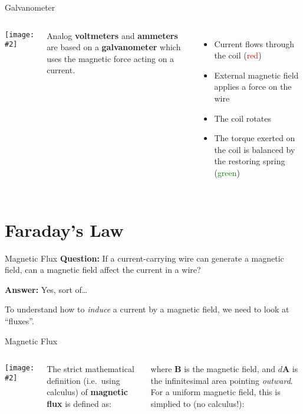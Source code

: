 \documentclass[12pt,aspectratio=169]{beamer}
\newcommand{\pic}[2]{\texttt{[image: \#2]}}
\newcommand{\eq}[2]{\vspace{#1}{\Large\begin{displaymath}#2\end{displaymath}}}
\begin{document}
\begin{frame}{Galvanometer}
  \begin{columns}
    \centering
    \pic1{800px-Galvanometer_diagram}

    Analog \textbf{voltmeters} and \textbf{ammeters} are based on a
    \textbf{galvanometer} which uses the magnetic force acting on a current.
    \begin{itemize}
    \item Current flows through the coil (\textcolor{red}{red})
    \item External magnetic field applies a force on the wire
    \item The coil rotates
    \item The torque exerted on the coil is balanced by the restoring spring
      (\textcolor{green}{green})
    \end{itemize}
  \end{columns}
\end{frame}



\section{Faraday's Law}

\begin{frame}{Magnetic Flux}
  \textbf{Question:} If a current-carrying wire can generate a magnetic field,
  can a magnetic field affect the current in a wire?

  \vspace{.3in}\textbf{Answer:} Yes, sort of\ldots

  \vspace{.3in}To understand how to \emph{induce} a current by a magnetic field,
  we need to look at ``fluxes''.
\end{frame}



\begin{frame}{Magnetic Flux}
  \begin{columns}
    \pic1{flux2}
  

    \vspace{.2in}The strict mathematical definition (i.e.\ using calculus) of
    \textbf{magnetic flux} is defined as:
    
    \eq{-.15in}{
      \boxed{\Phi_M=\int\bm{B}\cdot d\bm{A}}
    }
    
    where $\bm{B}$ is the magnetic field, and $d\bm{A}$ is the infinitesimal
    area pointing \emph{outward}. For a uniform magnetic field, this is
    simplied to (no calculus!):

    \eq{-.2in}{
      \Phi_M=\bm{B}\cdot\bm{A}
    }
  \end{columns}
\end{frame}
\end{document}
